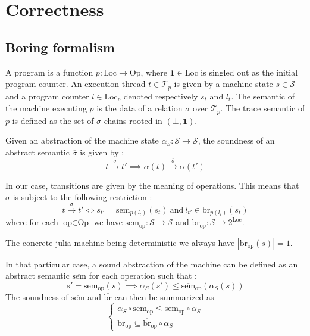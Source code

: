 \documentclass[14pt]{article}
\begin{document}
\section{Correctness}

\subsection{Boring formalism}

A program is a function $p:\text{Loc}\to\text{Op}$, where $\mathbf{1} \in \text{Loc}$ is singled out as the initial program counter. An execution thread $t\in\mathcal{T}_p$ is given by a machine state $s\in\mathcal{S}$ and a program counter $l\in\text{Loc}_p$ denoted respectively $s_t$ and $l_t$.
The semantic of the machine executing $p$ is the data of a relation $\sigma$ over $\mathcal{T}_p$. The trace semantic of $p$ is defined as the set of $\sigma$-chains rooted in $(\bot,\mathbf{1})$.

Given an abstraction of the machine state $\alpha_S : \mathcal{S}\to\overline{\mathcal{S}}$, the soundness of an abstract semantic $\overline{\sigma}$ is given by :
\[ t \xrightarrow{\sigma} t'  \implies \alpha(t) \xrightarrow{\overline{\sigma}} \alpha(t') \]

In our case, transitions are given by the meaning of operations. This means that $\sigma$ is subject to the following restriction :
\[ t \xrightarrow{\sigma} t' \iff s_{t'} = \text{sem}_{p(l_t)}(s_t) ~\text{and}~ l_{t'} \in \text{br}_{p(l_t)}(s_t)\]
where for each $\text{op} \in \text{Op}$ we have $\text{sem}_{\text{op}} : \mathcal{S}\to\mathcal{S}$ and $\text{br}_{\text{op}} : \mathcal{S} \to 2^\text{Loc}$.

The concrete julia machine being deterministic we always have $|\text{br}_{\text{op}}(s)|=1$.

In that particular case, a sound abstraction of the machine can be defined as an abstract semantic $\overline{\text{sem}}$ for each operation such that :
\[ s' = \text{sem}_{\text{op}}(s) \implies \alpha_S(s') \leq \overline{\text{sem}}_{\text{op}}(\alpha_S(s)) \]
The soundness of $\overline{\text{sem}}$ and $\overline{\text{br}}$ can then be summarized as
\[\left\{\begin{array}{ll}

\alpha_S \circ \text{sem}_{\text{op}} \leq \overline{\text{sem}}_{\text{op}} \circ \alpha_S \\
 \text{br}_{\text{op}} \subseteq \overline{\text{br}}_{\text{op}} \circ \alpha_S

\end{array}\right.\]
\end{document}
